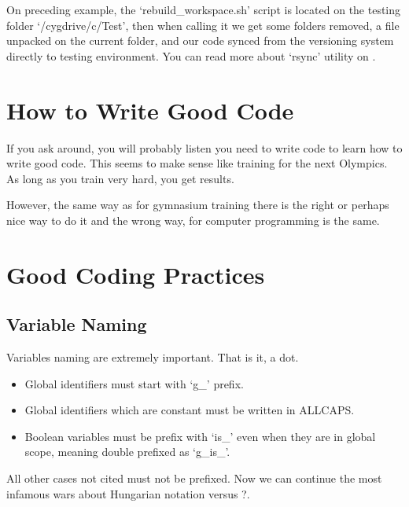 \begin{englishtext}
    On preceding example, the `rebuild\_workspace.sh' script is located on the
    testing folder `/cygdrive/c/Test', then when calling it we get some folders
    removed, a file unpacked on the current folder, and our code synced from the
    versioning system directly to testing environment. You can read more about
    `rsync' utility on .



    \section{How to Write Good Code}

    If you ask around, you will probably listen you need to write code to learn
    how to write good code. This seems to make sense like training for the next
    Olympics. As long as you train very hard, you get results.

    However, the same way as for gymnasium training there is the right or
    perhaps nice way to do it and the wrong way, for computer programming is the
    same.


    \section{Good Coding Practices}


    \subsection{Variable Naming}

    Variables naming are extremely important. That is it, a dot.

    \begin{itemize}

    \item Global identifiers must start with `g_' prefix.

    \item Global identifiers which are constant must be written in ALLCAPS.

    \item Boolean variables must be prefix with `is_' even when they are in
    global scope, meaning double prefixed as `g_is_'.

    \end{itemize}

    All other cases not cited must not be prefixed. Now we can continue the most
    infamous wars about Hungarian notation versus ?.


\end{englishtext}

